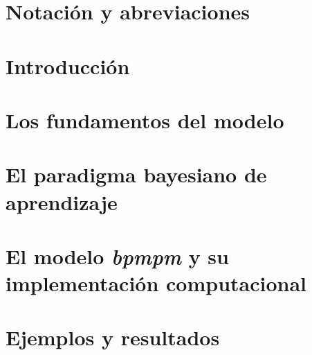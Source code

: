 \documentclass[pdftex,11pt, oneside]{book}
\theoremstyle{plain}
\theoremstyle{definition}
\begin{document}



\frontmatter
%


\tableofcontents
\listoffigures
\listoftables

\chapter{Notación y abreviaciones} \label{ap:Notacion}



\mainmatter
\chapter{Introducción} \label{cap:Intro}


\chapter{Los fundamentos del modelo} \label{cap:Modelo}


\chapter{El paradigma bayesiano de aprendizaje} \label{cap:BayesAlgoritmo}


\chapter{El modelo \textit{bpmpm} y su implementación computacional} \label{cap:bpwpm}


\chapter{Ejemplos y resultados} \label{cap:EjYRes}

\end{document}

